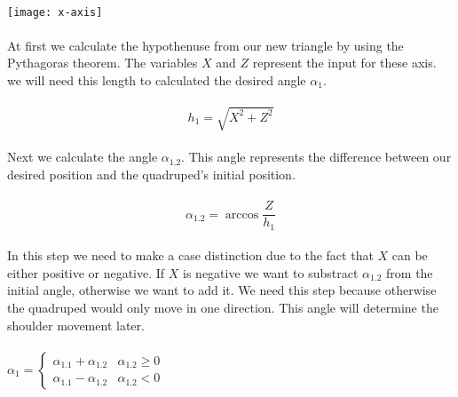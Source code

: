 \documentclass{article}
\begin{document}
    \paragraph{}
    \begin{center}
        \texttt{[image: x-axis]}
    \end{center}
    
    \paragraph{}
    At first we calculate the hypothenuse from our new triangle by using the Pythagoras theorem. The variables $X$ and $Z$ represent the input for these axis. we will need this length to calculated the desired angle $\alpha_1$.

    \paragraph{}
    \begin{equation}
        h_1 = \sqrt{X^2 + Z^2}
    \end{equation}

    \paragraph{}
    Next we calculate the angle $\alpha_{1.2}$. This angle represents the difference between our desired position and the quadruped's initial position. 

    \paragraph{}
    \begin{equation}
        \alpha_{1.2} = \arccos \frac{Z}{h_1}
    \end{equation}

    \paragraph{}
    In this step we need to make a case distinction due to the fact that $X$ can be either positive or negative. If $X$ is negative we want to substract $\alpha_{1.2}$ from the initial angle, otherwise we want to add it. We need this step because otherwise the quadruped would only move in one direction. This angle will determine the shoulder movement later.

    \paragraph{}
    \begin{center}
    $\alpha_1 = \left\{
    \begin{array}{ll}
    \alpha_{1.1} + \alpha_{1.2} & \alpha_{1.2} \ge 0 \\
    \alpha_{1.1} - \alpha_{1.2} & \alpha_{1.2} < 0
    \end{array}
    \right. $
    \end{center}
\end{document}
